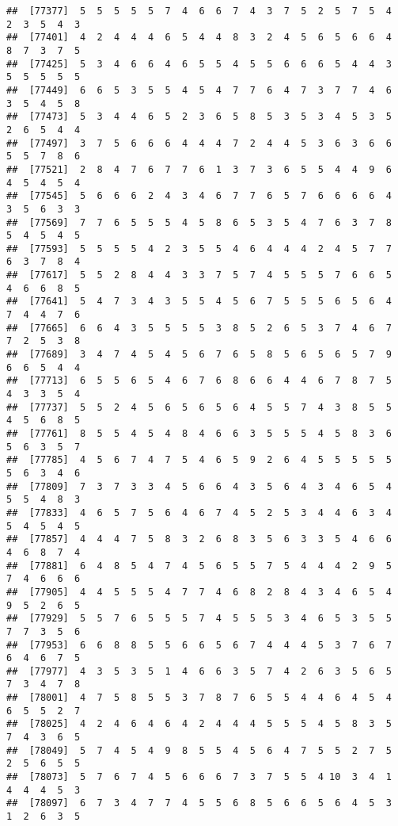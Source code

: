 \documentclass[
]{book}
\begin{document}
\begin{verbatim}
##  [77377]  5  5  5  5  5  7  4  6  6  7  4  3  7  5  2  5  7  5  4  2  3  5  4  3
##  [77401]  4  2  4  4  4  6  5  4  4  8  3  2  4  5  6  5  6  6  4  8  7  3  7  5
##  [77425]  5  3  4  6  6  4  6  5  5  4  5  5  6  6  6  5  4  4  3  5  5  5  5  5
##  [77449]  6  6  5  3  5  5  4  5  4  7  7  6  4  7  3  7  7  4  6  3  5  4  5  8
##  [77473]  5  3  4  4  6  5  2  3  6  5  8  5  3  5  3  4  5  3  5  2  6  5  4  4
##  [77497]  3  7  5  6  6  6  4  4  4  7  2  4  4  5  3  6  3  6  6  5  5  7  8  6
##  [77521]  2  8  4  7  6  7  7  6  1  3  7  3  6  5  5  4  4  9  6  4  5  4  5  4
##  [77545]  5  6  6  6  2  4  3  4  6  7  7  6  5  7  6  6  6  6  4  3  5  6  3  3
##  [77569]  7  7  6  5  5  5  4  5  8  6  5  3  5  4  7  6  3  7  8  5  4  5  4  5
##  [77593]  5  5  5  5  4  2  3  5  5  4  6  4  4  4  2  4  5  7  7  6  3  7  8  4
##  [77617]  5  5  2  8  4  4  3  3  7  5  7  4  5  5  5  7  6  6  5  4  6  6  8  5
##  [77641]  5  4  7  3  4  3  5  5  4  5  6  7  5  5  5  6  5  6  4  7  4  4  7  6
##  [77665]  6  6  4  3  5  5  5  5  3  8  5  2  6  5  3  7  4  6  7  7  2  5  3  8
##  [77689]  3  4  7  4  5  4  5  6  7  6  5  8  5  6  5  6  5  7  9  6  6  5  4  4
##  [77713]  6  5  5  6  5  4  6  7  6  8  6  6  4  4  6  7  8  7  5  4  3  3  5  4
##  [77737]  5  5  2  4  5  6  5  6  5  6  4  5  5  7  4  3  8  5  5  4  5  6  8  5
##  [77761]  8  5  5  4  5  4  8  4  6  6  3  5  5  5  4  5  8  3  6  5  6  3  5  7
##  [77785]  4  5  6  7  4  7  5  4  6  5  9  2  6  4  5  5  5  5  5  5  6  3  4  6
##  [77809]  7  3  7  3  3  4  5  6  6  4  3  5  6  4  3  4  6  5  4  5  5  4  8  3
##  [77833]  4  6  5  7  5  6  4  6  7  4  5  2  5  3  4  4  6  3  4  5  4  5  4  5
##  [77857]  4  4  4  7  5  8  3  2  6  8  3  5  6  3  3  5  4  6  6  4  6  8  7  4
##  [77881]  6  4  8  5  4  7  4  5  6  5  5  7  5  4  4  4  2  9  5  7  4  6  6  6
##  [77905]  4  4  5  5  5  4  7  7  4  6  8  2  8  4  3  4  6  5  4  9  5  2  6  5
##  [77929]  5  5  7  6  5  5  5  7  4  5  5  5  3  4  6  5  3  5  5  7  7  3  5  6
##  [77953]  6  6  8  8  5  5  6  6  5  6  7  4  4  4  5  3  7  6  7  6  4  6  7  5
##  [77977]  4  3  5  3  5  1  4  6  6  3  5  7  4  2  6  3  5  6  5  7  3  4  7  8
##  [78001]  4  7  5  8  5  5  3  7  8  7  6  5  5  4  4  6  4  5  4  6  5  5  2  7
##  [78025]  4  2  4  6  4  6  4  2  4  4  4  5  5  5  4  5  8  3  5  7  4  3  6  5
##  [78049]  5  7  4  5  4  9  8  5  5  4  5  6  4  7  5  5  2  7  5  2  5  6  5  5
##  [78073]  5  7  6  7  4  5  6  6  6  7  3  7  5  5  4 10  3  4  1  4  4  4  5  3
##  [78097]  6  7  3  4  7  7  4  5  5  6  8  5  6  6  5  6  4  5  3  1  2  6  3  5

\end{verbatim}
\end{document}

